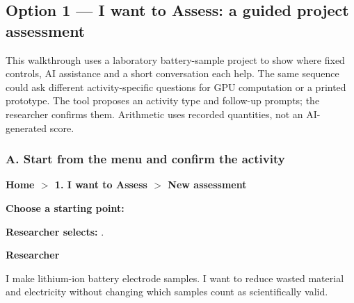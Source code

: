 \subsection{Option 1 --- I want to Assess: a guided project assessment}
\label{sec:assess-dialogue}
This walkthrough uses a laboratory battery-sample project to show where fixed controls, AI assistance and a short conversation each help. The same sequence could ask different activity-specific questions for GPU computation or a printed prototype. The tool proposes an activity type and follow-up prompts; the researcher confirms them. Arithmetic uses recorded quantities, not an AI-generated score.


\subsubsection*{A. Start from the menu and confirm the activity}
\begin{assessscreen}
\textbf{Home $>$ 1. I want to Assess $>$ New assessment}\par
\textbf{Choose a starting point:}\quad
{}\quad
{}\quad
{}\quad
{}\par\medskip
\textbf{Researcher selects:} .
\end{assessscreen}

\begin{flushright}\begin{assessuser}
\textbf{Researcher}\par
I make lithium-ion battery electrode samples. I want to reduce wasted material and electricity without changing which samples count as scientifically valid.
\end{assessuser}\end{flushright}

